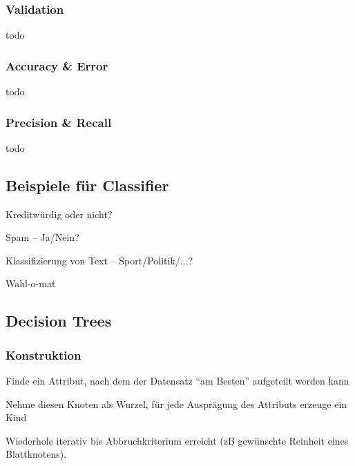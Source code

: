 \documentclass[10pt]{article} %
\begin{document}
\subsubsection{Validation} todo
\subsubsection{Accuracy \& Error} todo
\subsubsection{Precision \& Recall} todo

\subsection{Beispiele für Classifier}
\begin{cptitemize} 
       \item Kreditwürdig oder nicht?
       \item Spam -- Ja/Nein?
       \item Klassifizierung von Text -- Sport/Politik/...?
       \item Wahl-o-mat
 \end{cptitemize}  

\subsection{Decision Trees}

\subsubsection{Konstruktion} 

\begin{cptenumerate} 
      \item Finde ein Attribut, nach dem der Datensatz ``am Besten'' aufgeteilt werden kann
      \item Nehme diesen Knoten als Wurzel, für jede Ausprägung des Attributs erzeuge ein Kind
      \item Wiederhole iterativ bis Abbruchkriterium erreicht (zB gewünschte
        Reinheit eines Blattknotens).
\end{cptenumerate}
\end{document}
